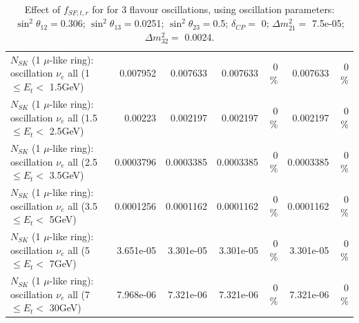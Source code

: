 \begin{table}
\begin{tabular}{| l | r | r | r  r | r  r |}
$N_{SK}$ (1 $\mu$-like ring): oscillation $\nu_{e}$ all (1 $\leq E_{t} <$ 1.5GeV) &        0.007952 &        0.007633 &        0.007633 &        0 \%  &        0.007633 &        0 \%  \\ 
$N_{SK}$ (1 $\mu$-like ring): oscillation $\nu_{e}$ all (1.5 $\leq E_{t} <$ 2.5GeV) &         0.00223 &        0.002197 &        0.002197 &        0 \%  &        0.002197 &        0 \%  \\ 
$N_{SK}$ (1 $\mu$-like ring): oscillation $\nu_{e}$ all (2.5 $\leq E_{t} <$ 3.5GeV) &       0.0003796 &       0.0003385 &       0.0003385 &        0 \%  &       0.0003385 &        0 \%  \\ 
$N_{SK}$ (1 $\mu$-like ring): oscillation $\nu_{e}$ all (3.5 $\leq E_{t} <$ 5GeV) &       0.0001256 &       0.0001162 &       0.0001162 &        0 \%  &       0.0001162 &        0 \%  \\ 
 $N_{SK}$ (1 $\mu$-like ring): oscillation $\nu_{e}$ all (5 $\leq E_{t} <$ 7GeV) &       3.651e-05 &       3.301e-05 &       3.301e-05 &        0 \%  &       3.301e-05 &        0 \%  \\ 
$N_{SK}$ (1 $\mu$-like ring): oscillation $\nu_{e}$ all (7 $\leq E_{t} <$ 30GeV) &       7.968e-06 &       7.321e-06 &       7.321e-06 &        0 \%  &       7.321e-06 &        0 \%  \\ 
\hline
\hline
\end{tabular}
\caption{ Effect of $f_{SF; t, r}$ for for 3 flavour oscillations, using oscillation parameters:  $\sin^2\theta_{12} = $0.306; $\sin^2\theta_{13} = $0.0251; $\sin^2\theta_{23} = $0.5; $\delta_{CP} = $        0; $\Delta m^2_{21} = $    7.5e-05; $\Delta m^2_{32} = $    0.0024. }
\label{tab:num_xsec_sf_1RmuT_3f_osc_t13:0.0251}
\end{table}
\clearpage
